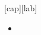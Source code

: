 \section{}
\begin{frame}{}
%
  [cap][lab]
%
  \begin{itemize}\itemfill
    \item 
  \end{itemize}
%
\end{frame}
